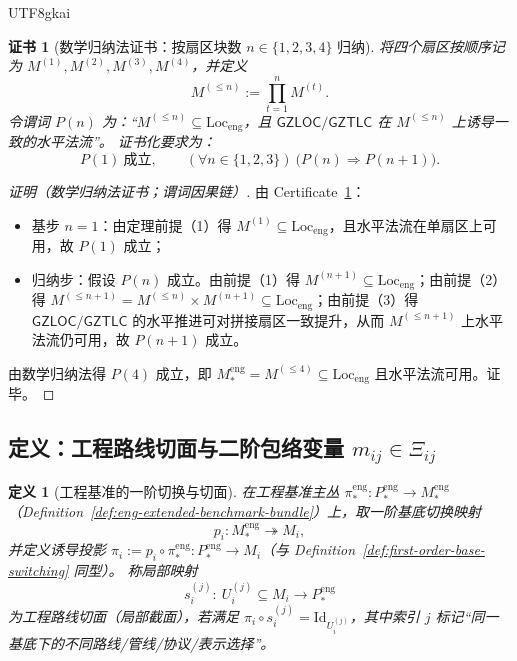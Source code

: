 \documentclass[12pt]{article}
\newtheorem{definition}{定义}[section]
\newtheorem{certificate}{证书}[section]
\newcommand{\GZLOC}{\ensuremath{\mathsf{GZLOC}}}
\newcommand{\GZTLC}{\ensuremath{\mathsf{GZTLC}}}
\begin{document}
\begin{CJK*}{UTF8}{gkai}
\begin{certificate}[数学归纳法证书：按扇区块数 $n\in\{1,2,3,4\}$ 归纳]
\label{cert:eng-sector-closure-induction}
将四个扇区按顺序记为 $M^{(1)},M^{(2)},M^{(3)},M^{(4)}$，并定义
\[
M^{(\le n)}:=\prod_{t=1}^{n} M^{(t)}.
\]
令谓词 $P(n)$ 为：“$M^{(\le n)}\subseteq \mathrm{Loc}_{\mathrm{eng}}$，且 $\GZLOC/\GZTLC$ 在 $M^{(\le n)}$ 上诱导一致的水平法流”。
证书化要求为：
\[
P(1)\ \text{成立},\qquad
(\forall n\in\{1,2,3\})\ \bigl(P(n)\Rightarrow P(n+1)\bigr).
\]
\end{certificate}

\begin{proof}[证明（数学归纳法证书；谓词因果链）]
由 Certificate~\ref{cert:eng-sector-closure-induction}：
\begin{itemize}
  \item 基步 $n=1$：由定理前提（1）得 $M^{(1)}\subseteq \mathrm{Loc}_{\mathrm{eng}}$，且水平法流在单扇区上可用，故 $P(1)$ 成立；
  \item 归纳步：假设 $P(n)$ 成立。由前提（1）得 $M^{(n+1)}\subseteq \mathrm{Loc}_{\mathrm{eng}}$；由前提（2）得
  $M^{(\le n+1)}=M^{(\le n)}\times M^{(n+1)}\subseteq \mathrm{Loc}_{\mathrm{eng}}$；由前提（3）得 $\GZLOC/\GZTLC$
    的水平推进可对拼接扇区一致提升，从而 $M^{(\le n+1)}$ 上水平法流仍可用，故 $P(n+1)$ 成立。
\end{itemize}
由数学归纳法得 $P(4)$ 成立，即 $M_\ast^{\mathrm{eng}}=M^{(\le 4)}\subseteq \mathrm{Loc}_{\mathrm{eng}}$ 且水平法流可用。证毕。
\end{proof}

\subsection{定义：工程路线切面与二阶包络变量 $m_{ij}\in \Xi_{ij}$}

\begin{definition}[工程基准的一阶切换与切面]
\label{def:eng-base-switch-section}
在工程基准主丛 $\pi_\ast^{\mathrm{eng}}:P_\ast^{\mathrm{eng}}\to M_\ast^{\mathrm{eng}}$（Definition~\ref{def:eng-extended-benchmark-bundle}）上，取一阶基底切换映射
\[
p_i: M_\ast^{\mathrm{eng}}\twoheadrightarrow M_i,
\]
并定义诱导投影 $\pi_i:=p_i\circ \pi_\ast^{\mathrm{eng}}:P_\ast^{\mathrm{eng}}\to M_i$（与 Definition~\ref{def:first-order-base-switching} 同型）。
称局部映射
\[
s_i^{(j)}:\ U_i^{(j)}\subseteq M_i\to P_\ast^{\mathrm{eng}}
\]
为工程路线切面（局部截面），若满足 $\pi_i\circ s_i^{(j)}=\mathrm{Id}_{U_i^{(j)}}$，其中索引 $j$ 标记“同一基底下的不同路线/管线/协议/表示选择”。
\end{definition}


\end{CJK*}
\end{document}
